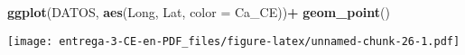 \documentclass[
]{article}
\newenvironment{Shaded}{\begin{snugshade}}{\end{snugshade}}
\newcommand{\DataTypeTok}[1]{\textcolor[rgb]{0.13,0.29,0.53}{#1}}
\newcommand{\DecValTok}[1]{\textcolor[rgb]{0.00,0.00,0.81}{#1}}
\newcommand{\KeywordTok}[1]{\textcolor[rgb]{0.13,0.29,0.53}{\textbf{#1}}}
\newcommand{\NormalTok}[1]{#1}
\newcommand{\OperatorTok}[1]{\textcolor[rgb]{0.81,0.36,0.00}{\textbf{#1}}}
\newcommand{\StringTok}[1]{\textcolor[rgb]{0.31,0.60,0.02}{#1}}
\begin{document}
\begin{Shaded}
\begin{Highlighting}[]
\KeywordTok{ggplot}\NormalTok{(DATOS, }\KeywordTok{aes}\NormalTok{(Long, Lat, }\DataTypeTok{color =}\NormalTok{ Ca_CE))}\OperatorTok{+}
\StringTok{  }\KeywordTok{geom_point}\NormalTok{()}
\end{Highlighting}
\end{Shaded}

\texttt{[image: entrega-3-CE-en-PDF\_files/figure-latex/unnamed-chunk-26-1.pdf]}

\begin{Shaded}
\end{Shaded}
\end{document}
